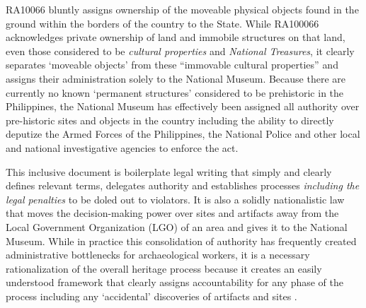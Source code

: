 
RA10066 bluntly assigns ownership of the moveable physical objects found in the ground within the borders of the country to the State. While RA100066 acknowledges private ownership of land and immobile structures on that land, even those considered to be \textit{cultural properties} and \textit{National Treasures}, it clearly separates ‘moveable objects’ from these “immovable cultural properties” \parencite{RA10066} and assigns their administration solely to the National Museum. Because there are currently no known ‘permanent structures’ considered to be prehistoric in the Philippines, the National Museum has effectively been assigned all authority over pre-historic sites and objects in the country including the ability to directly deputize the Armed Forces of the Philippines, the National Police and other local and national investigative agencies to enforce the act. 

This inclusive document is boilerplate legal writing that simply and clearly defines relevant terms, delegates authority and establishes processes \textit{including the legal penalties} to be doled out to violators. 
It is also a solidly nationalistic law that moves the decision-making power over sites and artifacts away from the Local Government Organization (LGO) of an area and gives it to the National Museum. While in practice this consolidation of authority has frequently created administrative bottlenecks for archaeological workers, it is a necessary rationalization of the overall heritage process because it creates an easily understood framework that clearly assigns accountability for any phase of the process including any ‘accidental’ discoveries of artifacts and sites \parencite[8]{RA10066}.

